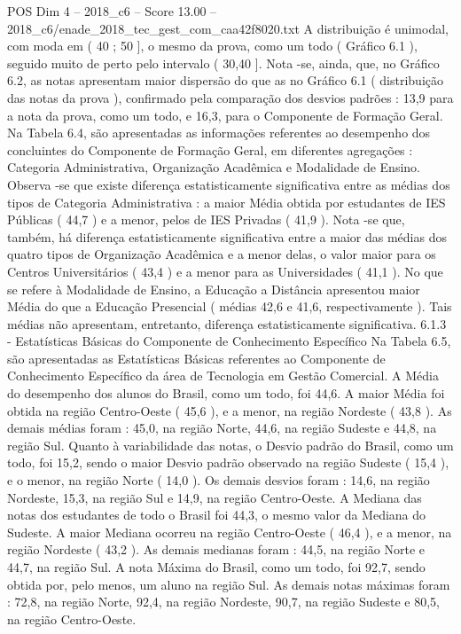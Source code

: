 \begin{textsample}{POS Dim 4 – 2018\_c6 – Score 13.00 – 2018\_c6/enade\_2018\_tec\_gest\_com\_caa42f8020.txt}
A distribuição é unimodal, com moda em ( 40 ; 50 ], o mesmo da prova, como um todo ( Gráfico 6.1 ), seguido muito de perto pelo intervalo ( 30,40 ].
Nota -se, ainda, que, no Gráfico 6.2, as notas apresentam maior dispersão do que as no Gráfico 6.1 ( distribuição das notas da prova ), confirmado pela comparação dos desvios padrões : 13,9 para a nota da prova, como um todo, e 16,3, para o Componente de Formação Geral.
Na Tabela 6.4, são apresentadas as informações referentes ao desempenho dos concluintes do Componente de Formação Geral, em diferentes agregações : Categoria Administrativa, Organização Acadêmica e Modalidade de Ensino.
Observa -se que existe diferença estatisticamente significativa entre as médias dos tipos de Categoria Administrativa : a maior Média obtida por estudantes de IES Públicas ( 44,7 ) e a menor, pelos de IES Privadas ( 41,9 ).
Nota -se que, também, há diferença estatisticamente significativa entre a maior das médias dos quatro tipos de Organização Acadêmica e a menor delas, o valor maior para os Centros Universitários ( 43,4 ) e a menor para as Universidades ( 41,1 ).
No que se refere à Modalidade de Ensino, a Educação a Distância apresentou maior Média do que a Educação Presencial ( médias 42,6 e 41,6, respectivamente ).
Tais médias não apresentam, entretanto, diferença estatisticamente significativa. 6.1.3 - Estatísticas Básicas do Componente de Conhecimento Específico Na Tabela 6.5, são apresentadas as Estatísticas Básicas referentes ao Componente de Conhecimento Específico da área de Tecnologia em Gestão Comercial.
A Média do desempenho dos alunos do Brasil, como um todo, foi 44,6.
A maior Média foi obtida na região Centro-Oeste ( 45,6 ), e a menor, na região Nordeste ( 43,8 ).
As demais médias foram : 45,0, na região Norte, 44,6, na região Sudeste e 44,8, na região Sul.
Quanto à variabilidade das notas, o Desvio padrão do Brasil, como um todo, foi 15,2, sendo o maior Desvio padrão observado na região Sudeste ( 15,4 ), e o menor, na região Norte ( 14,0 ).
Os demais desvios foram : 14,6, na região Nordeste, 15,3, na região Sul e 14,9, na região Centro-Oeste.
A Mediana das notas dos estudantes de todo o Brasil foi 44,3, o mesmo valor da Mediana do Sudeste.
A maior Mediana ocorreu na região Centro-Oeste ( 46,4 ), e a menor, na região Nordeste ( 43,2 ).
As demais medianas foram : 44,5, na região Norte e 44,7, na região Sul.
A nota Máxima do Brasil, como um todo, foi 92,7, sendo obtida por, pelo menos, um aluno na região Sul.
As demais notas máximas foram : 72,8, na região Norte, 92,4, na região Nordeste, 90,7, na região Sudeste e 80,5, na região Centro-Oeste.

\end{textsample}
